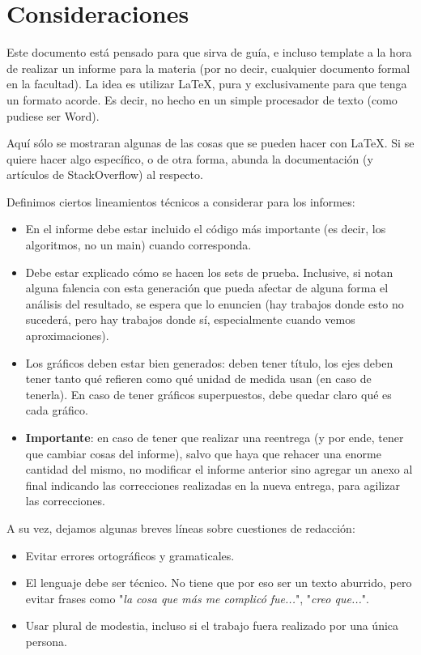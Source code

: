 \section{Consideraciones}

Este documento está pensado para que sirva de guía, e incluso template a la hora de realizar un informe para la materia (por no decir, cualquier documento formal en la facultad). La idea es utilizar \LaTeX, pura y exclusivamente para que tenga un formato acorde. Es decir, no hecho en un simple procesador de texto (como pudiese ser Word). 

Aquí sólo se mostraran algunas de las cosas que se pueden hacer con \LaTeX. Si se quiere hacer algo específico, o de otra forma, abunda la documentación (y artículos de StackOverflow) al respecto. 

Definimos ciertos lineamientos técnicos a considerar para los informes: 
\begin{itemize}
    \item En el informe debe estar incluido el código más importante (es decir, los algoritmos, no un main) cuando corresponda. 
    \item Debe estar explicado cómo se hacen los sets de prueba. Inclusive, si notan alguna falencia con esta generación que pueda afectar de alguna forma el análisis del resultado, se espera que lo enuncien (hay trabajos donde esto no sucederá, pero hay trabajos donde sí, especialmente cuando vemos aproximaciones). 
    \item Los gráficos deben estar bien generados: deben tener título, los ejes deben tener tanto qué refieren como qué unidad de medida usan (en caso de tenerla). En caso de tener gráficos superpuestos, debe quedar claro qué es cada gráfico. 
    \item \textbf{Importante}: en caso de tener que realizar una reentrega (y por ende, tener que cambiar cosas del informe), salvo que haya que rehacer una enorme cantidad del mismo, no modificar el informe anterior sino agregar un anexo al final indicando las correcciones realizadas en la nueva entrega, para agilizar las correcciones. 
\end{itemize}

A su vez, dejamos algunas breves líneas sobre cuestiones de redacción: 
\begin{itemize}
    \item Evitar errores ortográficos y gramaticales. 
    \item El lenguaje debe ser técnico. No tiene que por eso ser un texto aburrido, pero evitar frases como "\textit{la cosa que más me complicó fue...}", "\textit{creo que...}". 
    \item Usar plural de modestia, incluso si el trabajo fuera realizado por una única persona.
\end{itemize}